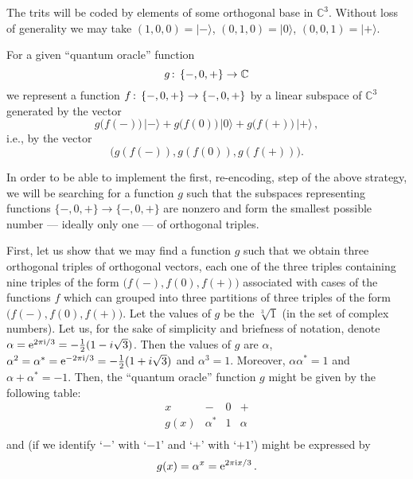 \documentclass{article}
\begin{document}
 The trits will be coded by
elements of some  orthogonal base in ${\mathbb{ C}}^3$. Without loss of
generality we may take
$(1,0,0) = |-\rangle$, $(0,1,0) = |0\rangle$,
$(0,0,1) = |+\rangle $.

For a given ``quantum oracle'' function
$$g \,{:}\linebreak[0]\,\;
\{-,0,+\} \to {\mathbb{ C}}$$
we represent a function
$f
\,{:}\linebreak[0]\,\; \{-,0,+\} \to \{-,0,+\}$ by a linear subspace of
${\mathbb{ C}}^3$ generated by the vector
  $$g\bigl(f(-)\bigr)\,|-\rangle +
    g\bigl(f(0)\bigr)\,|0\rangle +
    g\bigl(f(+)\bigr)\,|+\rangle\,,$$
i.e., by the vector
$$\bigl(g(f(-)), g(f(0)), g(f(+))\bigr).$$


In order to be able to implement the first, re-encoding, step of the above strategy,
we will be searching for a function $g$ such that the subspaces representing functions
$\{-,0,+\} \to \{-,0,+\}$ are nonzero and form the smallest possible number --- ideally only one ---
of orthogonal triples.

First, let us show that we may find a function $g$ such that we obtain three orthogonal triples of orthogonal vectors,
each one of the three triples containing nine triples of the form  $\bigl( f(-), f(0), f(+) \bigr)$  associated with cases of the functions $f$
which can grouped into three partitions of three triples of the form $\bigl( f(-), f(0), f(+) \bigr)$.
Let the values of $g$ be the $\sqrt[3]{1}$ (in the set
of complex numbers). Let us, for the sake of simplicity and briefness of notation,
denote $\alpha ={\rm e}^{2\pi {\rm i}/3}=-{1\over 2}(1-i\sqrt{3})$. Then the values of $g$ are
$\alpha$, $\alpha^2 = \alpha^\ast  = {\rm e}^{-2\pi {\rm i}/3}=-{1\over 2}(1+i\sqrt{3})$ and $\alpha^3=1$. Moreover, $\alpha
\alpha^\ast  = 1$ and $\alpha + \alpha^\ast = -1$. Then, the ``quantum
oracle'' function $g$ might be given by the following table:
  $$
  \begin {array}{c||c|c|c}

  x    & -       & 0 & +\\\hline
  g(x) & \alpha^\ast  & 1 & \alpha    \\

  \end {array}
  $$
and (if we identify `$-$' with `$-1$' and `$+$' with `$+1$') might be
expressed by
  $$g(x) = \alpha^x = {\rm e}^{2\pi{\rm i}x/3}\,.$$
\end{document}
